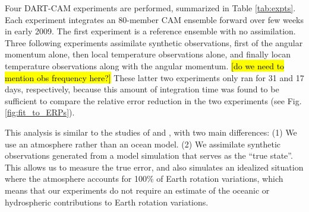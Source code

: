 Four DART-CAM experiments are performed, summarized in Table \ref{tab:expts}.
Each experiment 
integrates an 80-member CAM ensemble forward over few weeks in early 2009.
The first experiment is a reference ensemble with no assimilation. 
Three following experiments assimilate synthetic observations, first of the angular momentum alone, then local temperature observations alone, and finally locan temperature observations along with the angular momentum. 
\hl{[do we need to mention obs frequency here?]}
These latter two experiments only ran for 31 and 17 days, respectively, because this amount of integration time was found to be sufficient to compare the relative error reduction in the two experiments (see Fig. \ref{fig:fit_to_ERPs}). 

This analysis is similar to the studies of \citet{Saynisch2010,Saynisch2011} and \citet{Saynisch2012}, with two main differences:
(1) We use an atmosphere rather than an ocean model.
(2) We assimilate synthetic observations generated from a model simulation that serves as the ``true state''. 
This allows us to measure the true error, and 
also simulates an idealized situation where the atmosphere accounts for 100\% of Earth rotation variations, which means that our experiments do not require an estimate of the oceanic or hydrospheric contributions to Earth rotation variations.
